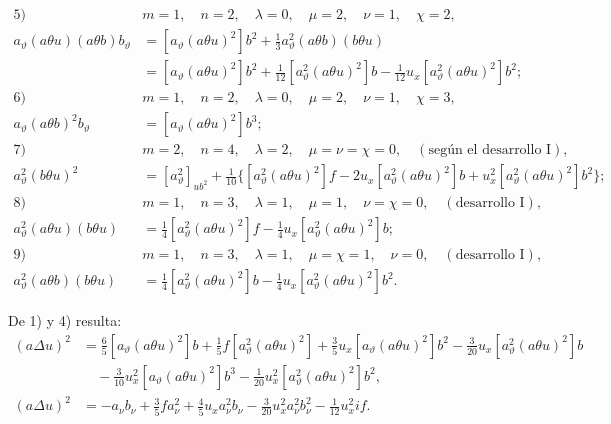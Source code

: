 \documentclass[11pt]{article}
\begin{document}
\begin{align*}
\text{5)}\quad&m=1,\quad n=2,\quad \lambda=0,\quad \mu=2,\quad \nu=1,\quad \chi=2,\\
a_\vartheta(a\theta u)(a\theta b)b_\vartheta
&=[a_\vartheta(a\theta u)^2]b^2+\frac13a_\vartheta^2(a\theta b)(b\theta u)\\
&=[a_\vartheta(a\theta u)^2]b^2+\frac1{12}[a_\vartheta^2(a\theta u)^2]b-\frac1{12}u_x[a_\vartheta^2(a\theta u)^2]b^2;\\[.6em]
\text{6)}\quad&m=1,\quad n=2,\quad \lambda=0,\quad \mu=2,\quad \nu=1,\quad \chi=3,\\
a_\vartheta(a\theta b)^2b_\vartheta&=[a_\vartheta(a\theta u)^2]b^3;\\[.6em]
\text{7)}\quad&m=2,\quad n=4,\quad \lambda=2,\quad \mu=\nu=\chi=0,\quad (\text{según el desarrollo I}),\\
a_\vartheta^2(b\theta u)^2&=[a_\vartheta^2]_{ub^2}+\frac1{10}\{[a_\vartheta^2(a\theta u)^2]f-2u_x[a_\vartheta^2(a\theta u)^2]b+u_x^2[a_\vartheta^2(a\theta u)^2]b^2\};\\[.6em]
\text{8)}\quad&m=1,\quad n=3,\quad \lambda=1,\quad \mu=1,\quad \nu=\chi=0,\quad (\text{desarrollo I}),\\
a_\vartheta^2(a\theta u)(b\theta u)&=\frac14[a_\vartheta^2(a\theta u)^2]f-\frac14u_x[a_\vartheta^2(a\theta u)^2]b;\\[.6em]
\text{9)}\quad&m=1,\quad n=3,\quad \lambda=1,\quad \mu=\chi=1,\quad \nu=0,\quad (\text{desarrollo I}),\\
a_\vartheta^2(a\theta b)(b\theta u)&=\frac14[a_\vartheta^2(a\theta u)^2]b-\frac14u_x[a_\vartheta^2(a\theta u)^2]b^2.
\end{align*}

De 1) y 4) resulta:
\[
\begin{aligned}
(a\Delta u)^2
&=\frac65[a_\vartheta(a\theta u)^2]b+\frac15f[a_\vartheta^2(a\theta u)^2]+\frac35u_x[a_\vartheta(a\theta u)^2]b^2-\frac3{20}u_x[a_\vartheta^2(a\theta u)^2]b\\
&\quad-\frac3{10}u_x^2[a_\vartheta(a\theta u)^2]b^3-\frac1{20}u_x^2[a_\vartheta^2(a\theta u)^2]b^2,\\
(a\Delta u)^2
&=-a_\nu b_\nu+\frac35fa_\nu^2+\frac45u_xa_\nu^2b_\nu-\frac3{20}u_x^2a_\nu^2b_\nu^2-\frac1{12}u_x^2if.
\end{aligned}
\]
\end{document}
